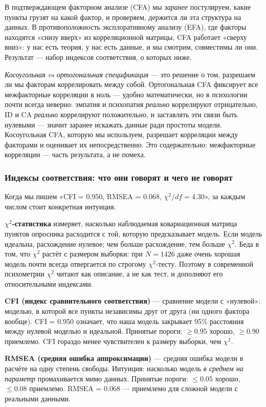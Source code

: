 В подтверждающем факторном анализе (CFA) мы \emph{заранее} постулируем, какие пункты грузят на какой фактор, и проверяем, держится ли эта структура на данных. В противоположность эксплоративному анализу (EFA), где факторы находятся «снизу вверх» из корреляционной матрицы, CFA работает «сверху вниз»: у нас есть теория, у нас есть данные, и мы смотрим, совместимы ли они. Результат --- набор индексов соответствия, о которых ниже.

\emph{Косоугольная vs ортогональная спецификация} --- это решение о том, разрешаем ли мы факторам коррелировать между собой. Ортогональная CFA фиксирует все межфакторные корреляции в ноль --- удобно математически, но в психологии почти всегда неверно: эмпатия и психопатия \emph{реально} коррелируют отрицательно, ID и CA \emph{реально} коррелируют положительно, и заставлять эти связи быть нулевыми --- значит заранее искажать данные ради простоты модели. Косоугольная CFA, которую мы используем, разрешает корреляции между факторами и оценивает их непосредственно. Это содержательно: межфакторные корреляции --- часть результата, а не помеха.

\subsubsection{Индексы соответствия: что они говорят и чего не говорят}

Когда мы пишем «CFI = 0.950, RMSEA = 0.068, $\chi^2/df = 4.30$», за каждым числом стоит конкретная интуиция.

\textbf{$\chi^2$-статистика} измеряет, насколько наблюдаемая ковариационная матрица пунктов опросника расходится с той, которую предсказывает модель. Если модель идеальна, расхождение нулевое; чем больше расхождение, тем больше $\chi^2$. Беда в том, что $\chi^2$ растёт с размером выборки: при $N = 1426$ даже очень хорошая модель почти всегда отвергается по строгому $\chi^2$-тесту. Поэтому в современной психометрии $\chi^2$ читают как описание, а не как тест, и дополняют его относительными индексами.

\textbf{CFI (индекс сравнительного соответствия)} --- сравнение модели с «нулевой»: моделью, в которой все пункты независимы друг от друга (ни одного фактора вообще). CFI = 0.950 означает, что наша модель закрывает 95\% расстояния между нулевой моделью и идеальной. Принятые пороги: $\geq 0.95$ хорошо, $\geq 0.90$ приемлемо. CFI гораздо менее чувствителен к размеру выборки, чем $\chi^2$.

\textbf{RMSEA (средняя ошибка аппроксимации)} --- средняя ошибка модели в расчёте на одну степень свободы. Интуиция: насколько модель \emph{в среднем на параметр} промахивается мимо данных. Принятые пороги: $\leq 0.05$ хорошо, $\leq 0.08$ приемлемо. RMSEA = 0.068 --- приемлемо для сложной модели с реальными данными.

